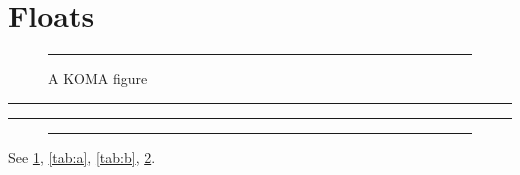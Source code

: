 \documentclass[captions=tableheading]{scrartcl}
\begin{document}
\listoffigures
\listoftables
\section{Floats}
\begin{figure}[htbp]
\centering\rule{3cm}{1cm}
\caption{A KOMA figure}\label{fig:a}
\end{figure}
\begin{table}[htbp]
\caption{A KOMA table with tableheading}\label{tab:a}
\centering\rule{3cm}{1cm}
\end{table}
\begin{table}[htbp]
\label{tab:b}
\centering\rule{3cm}{1cm}
\end{table}
\begin{figure}[htbp]
\centering\rule{3cm}{1cm}
\label{fig:b}
\end{figure}
See \ref{fig:a}, \ref{tab:a}, \ref{tab:b}, \ref{fig:b}.
\end{document}
